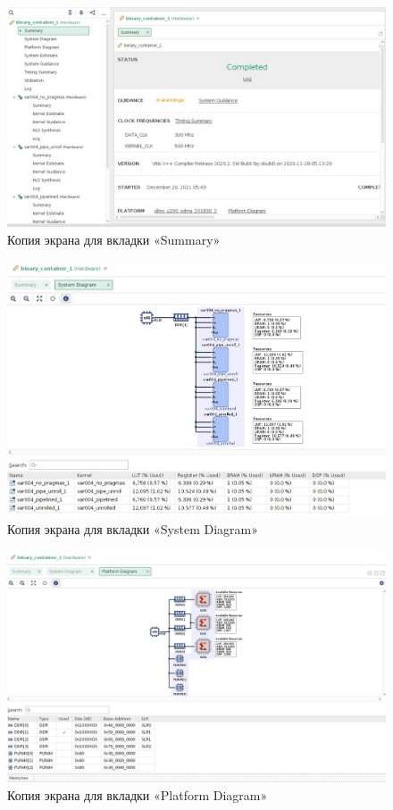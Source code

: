\documentclass[12pt]{report}
\begin{document}
\begin{figure}[h!p]
	\centering
	\includegraphics[scale = 0.37]{sum.png}
	\caption{Копия экрана для вкладки «Summary»}
	\label{img:sum}
\end{figure}
\begin{figure}[h!p]
	\centering
	\includegraphics[scale = 0.42]{sys_dia.png}
	\caption{Копия экрана для вкладки «System Diagram»}
	\label{img:sys_dia}
\end{figure}
\begin{figure}[h!p]
	\centering
	\includegraphics[width = \linewidth]{plat_dia.png}
	\caption{Копия экрана для вкладки «Platform Diagram»}
	\label{img:plat_dia}
\end{figure}
\end{document}
